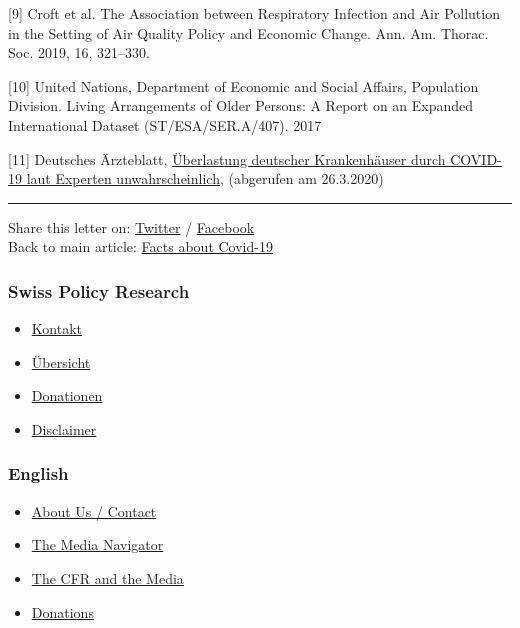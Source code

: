 {[}9{]} Croft et al. The Association between Respiratory Infection and
Air Pollution in the Setting of Air Quality Policy and Economic Change.
Ann. Am. Thorac. Soc. 2019, 16, 321--330.

{[}10{]} United Nations, Department of Economic and Social Affairs,
Population Division. Living Arrange­ments of Older Persons: A Report on
an Expanded International Dataset (ST/ESA/SER.A/407). 2017

{[}11{]} Deutsches Ärzteblatt,
\href{https://www.aerzteblatt.de/nachrichten/111029/Ueberlastung-deutscher-Krankenhaeuser-durch-COVID-19-laut-Experten-unwahrscheinlich}{Überlastung
deutscher Krankenhäuser durch COVID-19 laut Experten unwahrscheinlich},
(abgerufen am 26.3.2020)

\begin{center}\rule{0.5\linewidth}{\linethickness}\end{center}

Share this letter on:
\href{https://twitter.com/intent/tweet?url=https://swprs.org/open-letter-from-professor-sucharit-bhakdi-to-german-chancellor-dr-angela-merkel/}{Twitter}
/
\href{https://www.facebook.com/share.php?u=https://swprs.org/open-letter-from-professor-sucharit-bhakdi-to-german-chancellor-dr-angela-merkel/}{Facebook}\\
Back to main article:
\href{https://swprs.org/a-swiss-doctor-on-covid-19/}{Facts about
Covid-19}

\hypertarget{swiss-policy-research}{%
\subsubsection{Swiss Policy Research}\label{swiss-policy-research}}

\begin{itemize}
\tightlist
\item
  \href{https://swprs.org/kontakt/}{Kontakt}
\item
  \href{https://swprs.org/uebersicht/}{Übersicht}
\item
  \href{https://swprs.org/donationen/}{Donationen}
\item
  \href{https://swprs.org/disclaimer/}{Disclaimer}
\end{itemize}

\hypertarget{english}{%
\subsubsection{English}\label{english}}

\begin{itemize}
\tightlist
\item
  \href{https://swprs.org/contact/}{About Us / Contact}
\item
  \href{https://swprs.org/media-navigator/}{The Media Navigator}
\item
  \href{https://swprs.org/the-american-empire-and-its-media/}{The CFR
  and the Media}
\item
  \href{https://swprs.org/donations/}{Donations}
\end{itemize}

